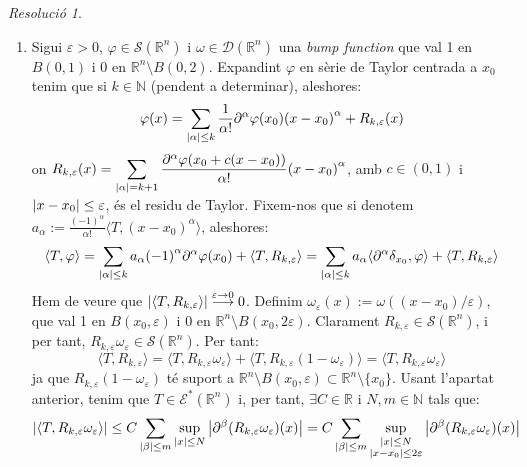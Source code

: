 \documentclass[10pt,a4paper]{article}
\newcommand{\NN}{\ensuremath{\mathbb{N}}} %
\newcommand{\RR}{\ensuremath{\mathbb{R}}} %
\theoremstyle{definition}
\theoremstyle{remark}
\newtheorem*{res}{Resolució}
\begin{document}
\begin{res}
\begin{enumerate}
    \item Sigui $\varepsilon>0$, $\varphi\in \mathcal{S}(\RR^n)$ i $\omega\in \mathcal{D}(\RR^n)$ una \emph{bump function} que val 1 en $B(0,1)$ i 0 en $\RR^n\setminus B(0,2)$.
          Expandint $\varphi$ en sèrie de Taylor centrada a $x_0$ tenim que si $k\in \NN$ (pendent a determinar), aleshores:
          $$
            \varphi(x) = \sum_{\abs{\alpha}\leq k}\frac{1}{\alpha!}\partial^\alpha\varphi(x_0){(x-x_0)}^\alpha + R_{k,\varepsilon}(x)
          $$
          on $\displaystyle R_{k,\varepsilon}(x) = \sum_{\abs{\alpha}=k+1}\frac{\partial^\alpha\varphi(x_0+c(x-x_0))}{\alpha!}{(x-x_0)}^\alpha$,
          amb $c\in(0,1)$ i $\abs{x-x_0}\leq\varepsilon$, és el residu de Taylor. Fixem-nos que si denotem $a_\alpha:=\displaystyle\frac{{(-1)}^\alpha}{\alpha!}\langle T,{(x-x_0)}^\alpha\rangle$, aleshores:
          $$
            \langle T,\varphi\rangle = \sum_{\abs{\alpha}\leq k}a_\alpha{(-1)}^\alpha\partial^\alpha\varphi(x_0) + \langle T,R_{k,\varepsilon}\rangle=\sum_{\abs{\alpha}\leq k}a_\alpha \langle \partial^\alpha\delta_{x_0},\varphi\rangle + \langle T,R_{k,\varepsilon}\rangle
          $$
          Hem de veure que $\abs{\langle T,R_{k,\varepsilon}\rangle}\overset{\varepsilon\to 0}{\longrightarrow}0$. Definim $\omega_\varepsilon(x):=\omega((x-x_0)/\varepsilon)$, que val 1 en $B(x_0,\varepsilon)$ i 0 en $\RR^n\setminus B(x_0,2\varepsilon)$. Clarament $R_{k,\varepsilon}\in \mathcal{S}(\RR^n)$, i per tant, $R_{k,\varepsilon}\omega_\varepsilon\in \mathcal{S}(\RR^n)$. Per tant:
          $$
            \langle T,R_{k,\varepsilon} \rangle = \langle T,R_{k,\varepsilon}\omega_\varepsilon\rangle + \langle T,R_{k,\varepsilon}(1-\omega_\varepsilon)\rangle = \langle T,R_{k,\varepsilon}\omega_\varepsilon\rangle
          $$
          ja que $R_{k,\varepsilon}(1-\omega_\varepsilon)$ té suport a $\RR^n\setminus B(x_0,\varepsilon)\subset \RR^n\setminus\{x_0\}$. Usant l'apartat anterior, tenim que $T\in \mathcal{E}^*(\RR^n)$ i, per tant, $\exists C\in\RR$ i $N,m\in\NN$ tals que:
          $$
            \abs{\langle T,R_{k,\varepsilon}\omega_\varepsilon\rangle}\leq C\sum_{\abs{\beta}\leq m}\sup_{\abs{x}\leq N}\abs{\partial^\beta (R_{k,\varepsilon}\omega_\varepsilon)(x)} = C\sum_{\abs{\beta}\leq m}\sup_{\substack{\abs{x}\leq N\\ \abs{x-x_0}\leq 2\varepsilon}}\abs{\partial^\beta (R_{k,\varepsilon}\omega_\varepsilon)(x)}
          $$


\end{enumerate}
\end{res}
\end{document}
